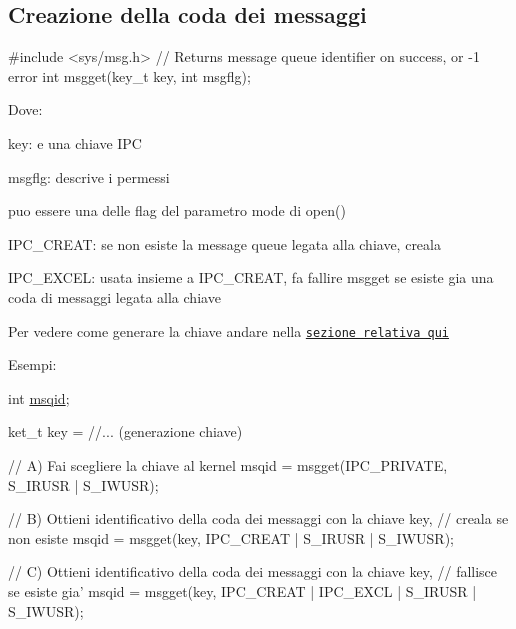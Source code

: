 \subsection*{Creazione della coda dei messaggi}


\begin{DoxyCode}
\textcolor{preprocessor}{#include <sys/msg.h>}
\textcolor{comment}{// Returns message queue identifier on success, or -1 error}
\textcolor{keywordtype}{int} msgget(key\_t key, \textcolor{keywordtype}{int} msgflg);
\end{DoxyCode}


Dove\+:
\begin{DoxyItemize}
\item {\ttfamily key}\+: e\textquotesingle{} una chiave I\+PC
\item {\ttfamily msgflg}\+: descrive i permessi
\begin{DoxyItemize}
\item puo\textquotesingle{} essere una delle flag del parametro {\ttfamily mode} di {\ttfamily open()}
\item {\ttfamily I\+P\+C\+\_\+\+C\+R\+E\+AT}\+: se non esiste la message queue legata alla chiave, creala
\item {\ttfamily I\+P\+C\+\_\+\+E\+X\+C\+EL}\+: usata insieme a {\ttfamily I\+P\+C\+\_\+\+C\+R\+E\+AT}, fa fallire msgget se esiste gia\textquotesingle{} una coda di messaggi legata alla chiave
\end{DoxyItemize}
\end{DoxyItemize}

Per vedere come generare la chiave andare nella \href{md_theory_generate_keys_generate_keys.html}{\tt sezione relativa qui}

Esempi\+: 
\begin{DoxyCode}
\textcolor{keywordtype}{int} \hyperlink{client_8c_ae73e6a837794db6e63f23db2d64a8130}{msqid};

ket\_t key = \textcolor{comment}{//... (generazione chiave)}

\textcolor{comment}{// A) Fai scegliere la chiave al kernel}
msqid = msgget(IPC\_PRIVATE, S\_IRUSR | S\_IWUSR);

\textcolor{comment}{// B) Ottieni identificativo della coda dei messaggi con la chiave key,}
\textcolor{comment}{//    creala se non esiste}
msqid = msgget(key, IPC\_CREAT | S\_IRUSR | S\_IWUSR);

\textcolor{comment}{// C) Ottieni identificativo della coda dei messaggi con la chiave key,}
\textcolor{comment}{//    fallisce se esiste gia'}
msqid = msgget(key, IPC\_CREAT | IPC\_EXCL | S\_IRUSR | S\_IWUSR);
\end{DoxyCode}


